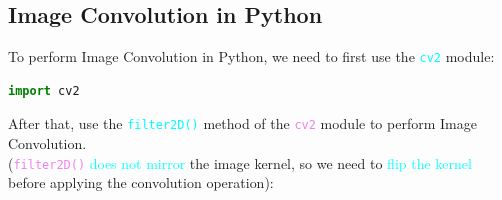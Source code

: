 \documentclass{book}
\begin{document}
\subsection{Image Convolution in Python}
To perform Image Convolution in Python, we need to first use the \textcolor{cyan}{\texttt{cv2}} module:
\begin{lstlisting}[language=Python, basicstyle=\ttfamily\small, keywordstyle=\color{blue}, commentstyle=\color{forestgreen}, stringstyle=\color{red}, showstringspaces=false]
                                            import cv2
\end{lstlisting}
After that, use the \textcolor{cyan}{\texttt{filter2D()}} method of the \textcolor{violet}{\texttt{cv2}} module to perform Image Convolution.\\
(\textcolor{violet}{\texttt{filter2D()}} \textcolor{cyan}{does not mirror} the image kernel, so we need to \textcolor{cyan}{flip the kernel} before applying the convolution operation):
\end{document}
